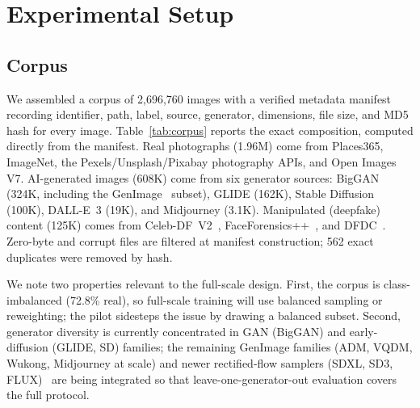 \documentclass[journal]{IEEEtran}
\begin{document}
\section{Experimental Setup}
\label{sec:setup}

\subsection{Corpus}
\label{sec:dataset}
We assembled a corpus of 2{,}696{,}760 images with a verified metadata manifest recording identifier, path, label, source, generator, dimensions, file size, and MD5 hash for every image. Table~\ref{tab:corpus} reports the exact composition, computed directly from the manifest. Real photographs (1.96M) come from Places365, ImageNet, the Pexels/Unsplash/Pixabay photography APIs, and Open Images V7. AI-generated images (608K) come from six generator sources: BigGAN (324K, including the GenImage~\cite{zhu2023genimage} subset), GLIDE (162K), Stable Diffusion (100K), DALL-E~3 (19K), and Midjourney (3.1K). Manipulated (deepfake) content (125K) comes from Celeb-DF~V2~\cite{li2020celebdf}, FaceForensics++~\cite{rossler2019}, and DFDC~\cite{dolhansky2020}. Zero-byte and corrupt files are filtered at manifest construction; 562 exact duplicates were removed by hash.

We note two properties relevant to the full-scale design. First, the corpus is class-imbalanced (72.8\% real), so full-scale training will use balanced sampling or reweighting; the pilot sidesteps the issue by drawing a balanced subset. Second, generator diversity is currently concentrated in GAN (BigGAN) and early-diffusion (GLIDE, SD) families; the remaining GenImage families (ADM, VQDM, Wukong, Midjourney at scale) and newer rectified-flow samplers (SDXL, SD3, FLUX)~\cite{esser2024} are being integrated so that leave-one-generator-out evaluation covers the full protocol.
\end{document}
